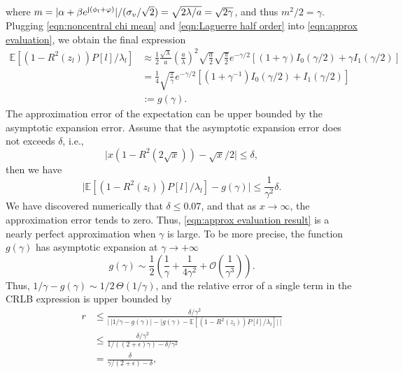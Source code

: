 \documentclass[12pt,draftclsnofoot,journal,onecolumn]{IEEEtran}
\theoremstyle{nonumberplain}
\begin{document}
    where $m=\lvert\alpha + \beta e^{{\rm j} (\phi_l + \varphi)}\rvert/(\sigma_v / \sqrt{2}) = \sqrt{2\lambda/a} = \sqrt{2\gamma}$, and thus $m^2/2=\gamma$. Plugging \eqref{eqn:noncentral chi mean} and \eqref{eqn:Laguerre half order} into \eqref{eqn:approx evaluation}, we obtain the final expression 
    \begin{equation}
        \begin{aligned}
        \mathbb{E}[(1-R^2(z_l))P[l]/\lambda_l] & \approx \frac{1}{2}\frac{\sqrt{\lambda}}{a}\left(\frac{a}{\lambda}\right)^2 \sqrt{\frac{a}{2}} \sqrt{\frac{\pi}{2}} e^{-\gamma/2}\left[(1+\gamma)I_0(\gamma/2)+\gamma I_1(\gamma/2)\right] \\
        & = \frac{1}{4}\sqrt{\frac{\pi}{\gamma}}e^{-\gamma/2}\left[(1+\gamma^{-1})I_0(\gamma/2)+ I_1(\gamma/2)\right] \\
        & := g(\gamma).
        \end{aligned}
        \label{eqn:approx evaluation result}
    \end{equation}
    The approximation error of the expectation can be upper bounded by the asymptotic expansion error. Assume that the asymptotic expansion error does not exceeds $\delta$, i.e.,
    \begin{equation}
        \lvert x(1-R^2(2\sqrt{x}))-\sqrt{x}/2 \rvert \leq \delta,
        \label{eqn:asymptotic error}
    \end{equation}
    then we have 
    \begin{equation}
        \lvert \mathbb{E}[(1-R^2(z_l))P[l]/\lambda_l] - g(\gamma)\rvert \leq \frac{1}{\gamma^2} \delta. 
    \end{equation}
    We have discovered numerically that $\delta \leq 0.07$, and that as $x\to \infty$, the approximation error tends to zero. Thus, \eqref{eqn:approx evaluation result} is a nearly perfect approximation when $\gamma$ is large. To be more precise, the function $g(\gamma)$ has asymptotic expansion at $\gamma \to +\infty$
    \begin{equation}
        g(\gamma) \sim \frac{1}{2}\left(\frac{1}{\gamma} + \frac{1}{4\gamma^2} + \mathcal{O}(\frac{1}{\gamma^3})\right).
    \end{equation}
    Thus, $1/\gamma - g(\gamma) \sim 1/2\,\Theta(1/\gamma)$, and the relative error of a single term in the CRLB expression is upper bounded by 
    \begin{equation}
        \begin{aligned}
        r & \leq \frac{\delta/\gamma^2}{\lvert \,\lvert 1/\gamma - g(\gamma)\rvert - \lvert g(\gamma) -  \mathbb{E}[(1-R^2(z_l))P[l]/\lambda_l]\rvert\,\rvert} \\
        & \leq \frac{\delta/\gamma^2}{1/((2+\epsilon)\gamma) - \delta/\gamma^2} \\
        & = \frac{\delta}{\gamma/(2+\epsilon) - \delta}, \\
        \end{aligned}
    \end{equation}
\end{document}
